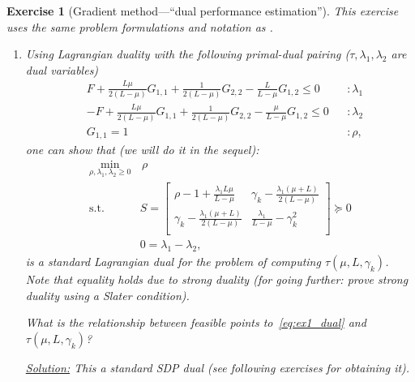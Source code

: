 \documentclass[11pt,a4paper]{article}
\newcommand{\correction}[1]{{{\color{blue}\underline{Solution:} #1}}}
\newcommand{\correction}[1]{}
\newtheorem{exercise}{Exercise}
\begin{document}
	\begin{exercise}[Gradient method---``dual performance estimation'']\label{ex2} This exercise uses the same problem formulations and notation as .
	\begin{enumerate}
		\item Using Lagrangian duality with the following primal-dual pairing ($\tau,\lambda_1,\lambda_2$ are dual variables)
	\begin{equation}\label{eq:ex2:assign_dual}
			\begin{aligned}
			& F + \tfrac{L\mu}{2(L-\mu)} G_{1,1}+\tfrac{1}{2(L-\mu)}G_{2,2}-\tfrac{L}{L-\mu}G_{1,2}\leqslant 0&&:\lambda_1\\
			&-F + \tfrac{L\mu}{2(L-\mu)} G_{1,1}+\tfrac{1}{2(L-\mu)}G_{2,2}-\tfrac{\mu}{L-\mu}G_{1,2}\leqslant 0&&:\lambda_2\\
			&G_{1,1}= 1&&:\rho,
			\end{aligned}
			\end{equation}
one can show that (we will do it in the sequel):
		\begin{equation}\label{eq:ex1_dual}	 
		\begin{aligned}
			\min_{\rho,\lambda_1,\lambda_2\geqslant 0} & \,\rho\\
			\text{s.t. }& S=\begin{bmatrix}
				\rho-1+\frac{\lambda_1 L\mu}{L-\mu } & \gamma_k-\frac{\lambda_1 (\mu +L)}{2 (L-\mu )} \\
				\gamma_k-\frac{\lambda_1 (\mu +L)}{2 (L-\mu )} & \frac{\lambda_1}{L-\mu }-\gamma_k^2 \\
			\end{bmatrix}\succcurlyeq 0\\
			&0=\lambda_1-\lambda_2,
		\end{aligned}
		\end{equation}
is a standard Lagrangian dual for the problem of computing $\tau(\mu,L,\gamma_k)$. Note that equality holds due to strong duality (for going further: prove strong duality using a Slater condition). 
	
	What is the relationship between feasible points to~\eqref{eq:ex1_dual} and $\tau(\mu,L,\gamma_k)$?
	
	\correction{This a standard SDP dual (see following exercises for obtaining it).
	
}
\end{enumerate}
\end{exercise}
\end{document}
